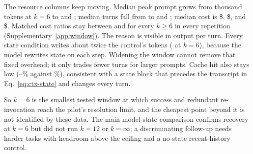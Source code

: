 The resource columns keep moving. Median peak prompt grows from
\WindowSixPeakMedian{} thousand tokens at $k=6$ to \WindowTwelvePeakMedian{}
and \WindowInfinitePeakMedian{}; median turns fall from
\WindowSixCallsMedian{} to \WindowTwelveCallsMedian{} and
\WindowInfiniteCallsMedian{}; median cost is \$\WindowSixCostMedian{},
\$\WindowTwelveCostMedian{}, and \$\WindowInfiniteCostMedian{}. Matched
cost ratios stay between \WindowInfiniteCostRatioMin{} and
\WindowTwelveCostRatioMax{} for every $k\geq6$ in every repetition
(Supplementary~\ref{app:window}). The reason is visible in output per turn.
Every state condition writes about twice the control's
\WindowControlOutputPerTurn{} tokens (\WindowSixOutputPerTurn{} at $k=6$),
because the model rewrites state on each step. Widening the window cannot
remove that fixed overhead; it only trades fewer turns for larger prompts.
Cache hit also stays low (\WindowSixCacheHit--\WindowInfiniteCacheHit\%
against \WindowControlCacheHit\%), consistent with a state block that
precedes the transcript in Eq.~\eqref{eq:ctx-state} and changes every turn.

So $k=6$ is the smallest tested window at which success and redundant
re-invocation reach the pilot's resolution limit, and the cheapest point
beyond it is not identified by these data. The main model-state comparison
confirms recovery at $k=6$ but did not run $k=12$ or $k=\infty$; a
discriminating follow-up needs harder tasks with headroom above the
ceiling and a no-state recent-history control.

